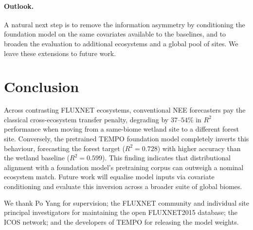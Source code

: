 \documentclass[sigconf]{acmart}          %
\begin{document}
\paragraph{Outlook.}
A natural next step is to remove the information asymmetry by conditioning the
foundation model on the same covariates available to the baselines, and to
broaden the evaluation to additional ecosystems and a global pool of sites.
We leave these extensions to future work.

\section{Conclusion}

Across contrasting FLUXNET ecosystems, conventional NEE forecasters pay the
classical cross-ecosystem transfer penalty, degrading by $37$--$54\%$ in
$R^2$ performance when moving from a same-biome wetland site to a different 
forest site. Conversely, the pretrained TEMPO foundation model completely 
inverts this behaviour, forecasting the forest target ($R^2=0.728$) with higher 
accuracy than the wetland baseline ($R^2=0.599$). This finding indicates that 
distributional alignment with a foundation model's pretraining corpus can 
outweigh a nominal ecosystem match. Future work will equalise model inputs 
via covariate conditioning and evaluate this inversion across a broader suite 
of global biomes.

\begin{acks}
We thank Po Yang for supervision; the FLUXNET community and individual site
principal investigators for maintaining the open FLUXNET2015 database; the
ICOS network; and the developers of TEMPO for releasing the model weights.
\end{acks}



\end{document}
